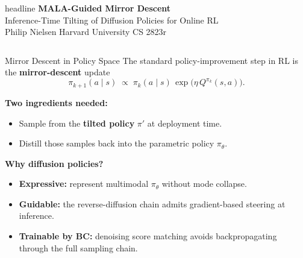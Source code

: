 \documentclass[final,hyperref={pdfpagelabels=false}]{beamer}
\newlength{\colwidth}
\begin{document}
\begin{frame}[t]

\begin{beamercolorbox}[wd=\paperwidth,ht=10cm]{headline}
\vspace{1cm}
\centering
{\fontsize{72}{80}\selectfont\bfseries MALA-Guided Mirror Descent}\\[0.8cm]
{\fontsize{42}{50}\selectfont Inference-Time Tilting of Diffusion Policies for Online RL}\\[1cm]
{\fontsize{36}{44}\selectfont Philip Nielsen \hspace{3cm} Harvard University \hspace{3cm} CS 2823r}\\[0.5cm]
\end{beamercolorbox}

\vspace{1cm}

\begin{columns}[t]

\begin{column}{\colwidth}

\begin{block}{\Large Mirror Descent in Policy Space}
The standard policy-improvement step in RL is the \textbf{mirror-descent} update
\[
\pi_{k+1}(a\mid s) \;\propto\; \pi_k(a\mid s)\,\exp\!\bigl(\eta\,Q^{\pi_k}(s,a)\bigr).
\]

\vspace{0.4em}
\textbf{Two ingredients needed:}
\begin{itemize}
    \item Sample from the \textbf{tilted policy} $\pi'$ at deployment time.
    \item Distill those samples back into the parametric policy $\pi_\theta$.
\end{itemize}

\vspace{0.4em}
\textbf{Why diffusion policies?}
\begin{itemize}
    \item \textbf{Expressive:} represent multimodal $\pi_\theta$ without mode collapse.
    \item \textbf{Guidable:} the reverse-diffusion chain admits gradient-based steering at inference.
    \item \textbf{Trainable by BC:} denoising score matching avoids backpropagating through the full sampling chain.
\end{itemize}


\end{block}
\end{column}
\end{columns}
\end{frame}
\end{document}
